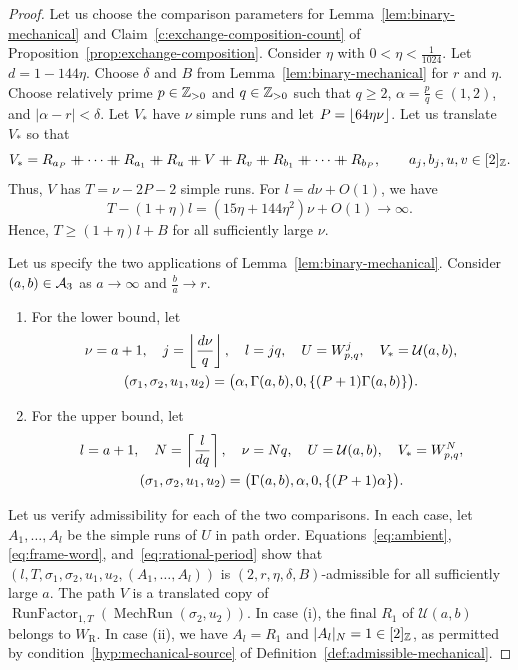 \begin{proof}
 Let us choose the comparison parameters for Lemma~\ref{lem:binary-mechanical} and Claim~\ref{c:exchange-composition-count} of Proposition~\ref{prop:exchange-composition}.
Consider $\eta$ with $0<\eta<\frac{1}{1024}$. Let $d=1-144\eta$.
Choose $\delta$ and $B$ from Lemma~\ref{lem:binary-mechanical} for $r$ and $\eta$.
Choose relatively prime $p\in\mathbb Z_{>0}$ and $q\in\mathbb Z_{>0}$ such that $q\ge2$,
$\alpha=\frac{p}{q}\in(1,2)$, and $|\alpha-r|<\delta$.
Let $V_*$ have $\nu$ simple runs and let $P=\left\lfloor64\eta\nu\right\rfloor$.
Let us translate $V_*$ so that
\[
 V_*=R_{a_P}\ccn \cdots\ccn R_{a_1}\ccn R_u\ccn V\ccn R_v\ccn R_{b_1}\ccn \cdots\ccn R_{b_P},
 \qquad a_j,b_j,u,v\in[2]_{\Z}.
\]
Thus, $V$ has $T=\nu-2P-2$ simple runs.
For $l=d\nu+O(1)$, we have
\[
 T-(1+\eta)l=(15\eta+144\eta^2)\nu+O(1)\longrightarrow\infty.
\]
Hence, $T\ge(1+\eta)l+B$ for all sufficiently large $\nu$.

Let us specify the two applications of Lemma~\ref{lem:binary-mechanical}.
Consider $(a,b)\in\mathcal A_3$ as $a\to\infty$ and $\frac ba\to r$.
\begin{enumerate}[label=(\roman*)]
\item For the lower bound, let
\[
\begin{gathered}
 \nu=a+1,\quad j=\left\lfloor\frac{d\nu}{q}\right\rfloor,\quad l=jq,\quad
 U=W_{p,q}^j,\quad V_*=\mathcal U(a,b),\\
 (\sigma_1,\sigma_2,u_1,u_2)
 =\bigl(\alpha,\Gamma(a,b),0,\{(P+1)\Gamma(a,b)\}\bigr).
\end{gathered}
\]
\item For the upper bound, let
\[
\begin{gathered}
 l=a+1,\quad N=\left\lceil\frac{l}{dq}\right\rceil,\quad \nu=Nq,\quad
 U=\mathcal U(a,b),\quad V_*=W_{p,q}^N,\\
 (\sigma_1,\sigma_2,u_1,u_2)
 =\bigl(\Gamma(a,b),\alpha,0,\{(P+1)\alpha\}\bigr).
\end{gathered}
\]
\end{enumerate}

Let us verify admissibility for each of the two comparisons.
In each case, let $A_1,\ldots,A_l$ be the simple runs of $U$ in path order.
Equations~\eqref{eq:ambient}, \eqref{eq:frame-word}, and~\eqref{eq:rational-period} show that
$(l,T,\sigma_1,\sigma_2,u_1,u_2,(A_1,\ldots,A_l))$ is
$(2,r,\eta,\delta,B)$-admissible for all sufficiently large $a$.
The path $V$ is a translated copy of
$\operatorname{RunFactor}_{1,T}(\operatorname{MechRun}(\sigma_2,u_2))$.
In case (i), the final $R_1$ of $\mathcal U(a,b)$ belongs to $W_{\mathrm R}$.
In case (ii), we have $A_l=R_1$ and $|A_l|_N=1\in[2]_{\mathbb Z}$, as permitted by condition~\ref{hyp:mechanical-source} of Definition~\ref{def:admissible-mechanical}.


\end{proof}
